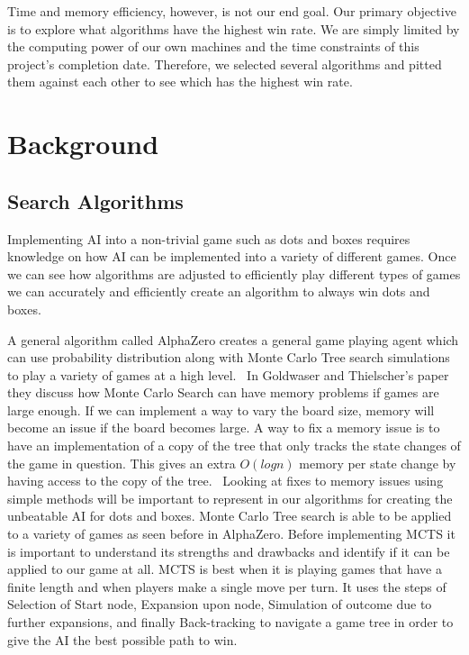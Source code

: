 \documentclass[12pt]{article}
\begin{document}
    Time and memory efficiency, however, is not our end goal. Our primary objective is to explore what algorithms have the highest win rate. We are simply limited by the computing power of our own machines and the time constraints of this project’s completion date. Therefore, we selected several algorithms and pitted them against each other to see which has the highest win rate. 


    \section{Background}

    \subsection{Search Algorithms}
    Implementing AI into a non-trivial game such as dots and boxes requires knowledge on how AI can be implemented into a variety of different games. Once we can see how algorithms are adjusted to efficiently play different types of games we can accurately and efficiently create an algorithm to always win dots and boxes. 
    
    A general algorithm called AlphaZero creates a general game playing agent which can use probability distribution along with Monte Carlo Tree search simulations to play a variety of games at a high level.~\cite{GeneralGame} In Goldwaser and Thielscher's paper they discuss how Monte Carlo Search can have memory problems if games are large enough. If we can implement a way to vary the board size, memory will become an issue if the board becomes large. A way to fix a memory issue is to have an implementation of a copy of the tree that only tracks the state changes of the game in question. This gives an extra \(O(logn)\) memory per state change by having access to the copy of the tree.~\cite{GeneralGame} Looking at fixes to memory issues using simple methods will be important to represent in our algorithms for creating the unbeatable AI for dots and boxes. Monte Carlo Tree search is able to be applied to a variety of games as seen before in AlphaZero. Before implementing MCTS it is important to understand its strengths and drawbacks and identify if it can be applied to our game at all. MCTS is best when it is playing games that have a finite length and when players make a single move per turn. It uses the steps of Selection of Start node, Expansion upon node, Simulation of outcome due to further expansions, and finally Back-tracking to navigate a game tree in order to give the AI the best possible path to win.~\cite{MCTS} 
    
\end{document}
